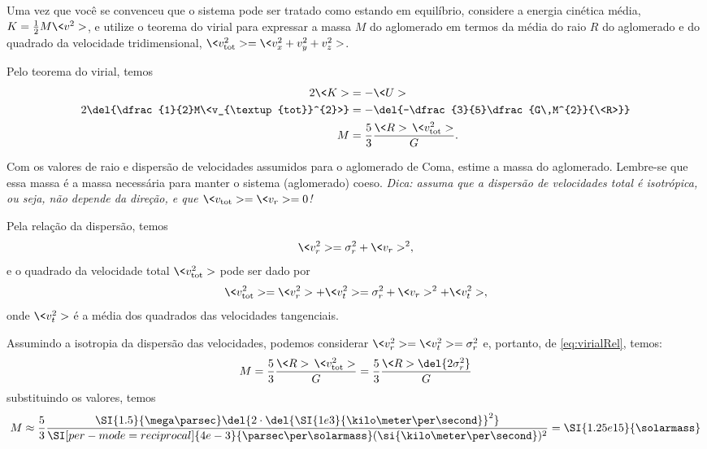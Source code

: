 \documentclass[]{IMTexam}
\begin{document}
\begin{questions}
\begin{unindent}[start=0]
\begin{solution}
			\hfill\qedsymbol
		\end{solution}

		\item Uma vez que você se convenceu que o sistema pode ser tratado como estando em equilíbrio, considere a energia cinética média, $ K=\frac{1}{2}M\<v^{2}> $, e utilize o teorema do virial para expressar a massa $ M $ do aglomerado em termos da média do raio $ R $ do aglomerado e do quadrado da velocidade tridimensional, $ \<v_{\textup{tot}}^{2}>=\<v_x^{2}+v_y^{2}+v_z^{2}> $.

		\begin{solution}
			Pelo teorema do virial, temos
			\begin{align}
				2\<K> & =-\<U>\nonumber                                                            \\ 2\del{\dfrac{1}{2}M\<v_{\textup{tot}}^{2}>}&=-\del{-\dfrac{3}{5}\dfrac{G\,M^{2}}{\<R>}}\nonumber\\
				M     & =\dfrac{5}{3}\dfrac{\<R>\,\<v_{\textup{tot}}^{2}>}{G}.\label{eq:virialRel}
			\end{align}
		\end{solution}


		\item Com os valores de raio e dispersão de velocidades assumidos para o aglomerado de Coma, estime a massa do aglomerado. Lembre-se que essa massa é a massa necessária para manter o sistema (aglomerado) coeso. \textit{Dica: assuma que a dispersão de velocidades total é isotrópica, ou seja, não depende da direção, e que $ \<v_{\textup{tot}}>=\<v_r>=0 $!}

		\begin{solution}
			Pela relação da dispersão, temos
			\[ \<v_r^{2}>=\sigma_r^{2}+\<v_r>^{2}, \]
			e o quadrado da velocidade total $ \<v_{\textup{tot}}^{2}> $ pode ser dado por
			\[ \<v_{\textup{tot}}^{2}>=\<v_r^{2}>+\<v_t^{2}>=\sigma_r^{2}+\<v_r>^{2}+\<v_t^{2}>, \]
			onde $ \<v_t^{2}> $ é a média dos quadrados das velocidades tangenciais.

			Assumindo a isotropia da dispersão das velocidades, podemos considerar $ \<v_r^{2}>=\<v_t^{2}>=\sigma_r^{2} $ e, portanto, de \ref{eq:virialRel}, temos:
			\[ M=\dfrac{5}{3}\dfrac{\<R>\,\<v_{\textup{tot}}^{2}>}{G}=\dfrac{5}{3}\dfrac{\<R>\del{2\sigma_r^{2}}}{G} \]
			substituindo os valores, temos
			\[ M\approx
				\dfrac{5}{3}\dfrac{\SI{1.5}{\mega\parsec}\del{2\cdot\del{\SI{1e3}{\kilo\meter\per\second}}^{2}}}{\SI[per-mode=reciprocal]{4e-3}{\parsec\per\solarmass}(\si{\kilo\meter\per\second})^{2}}=
				\SI{1.25e15}{\solarmass} \]
		\end{solution}


\end{unindent}
\end{questions}
\end{document}
